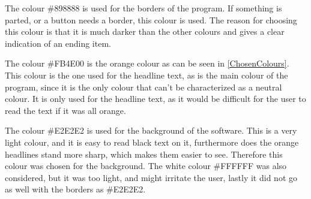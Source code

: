 The colour \#898888 is used for the borders of the program. If something is parted, or a button needs a border, this colour is used. The reason for choosing this colour is that it is much darker than the other colours and gives a clear indication of an ending item.

The colour \#FB4E00 is the orange colour as can be seen in \cref{ChosenColours}. This colour is the one used for the headline text, as is the main colour of the program, since it is the only colour that can't be characterized as a neutral colour. It is only used for the headline text, as it would be difficult for the user to read the text if it was all orange.

The colour \#E2E2E2 is used for the background of the software. This is a very light colour, and it is easy to read black text on it, furthermore does the orange headlines stand more sharp, which makes them easier to see. Therefore this colour was chosen for the background. The white colour \#FFFFFF was also considered, but it was too light, and might irritate the user, lastly it did not go as well with the borders as \#E2E2E2.

